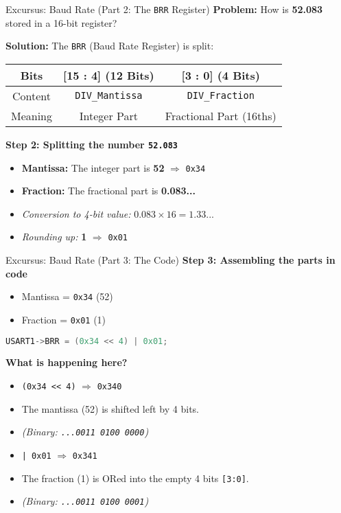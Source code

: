 \documentclass{beamer}
\begin{document}
\begin{frame}{Excursus: Baud Rate (Part 2: The \texttt{BRR} Register)}
\textbf{Problem:} How is \textbf{52.083} stored in a 16-bit register?

\medskip
\textbf{Solution:} The \texttt{BRR} (Baud Rate Register) is split:

\begin{center}
\begin{tabular}{|c|c|c|}
	\hline
	Bits & \textbf{[15 : 4]} (12 Bits) & \textbf{[3 : 0]} (4 Bits) \\ \hline
	Content & \texttt{DIV\_Mantissa} & \texttt{DIV\_Fraction} \\ 
	Meaning & Integer Part & Fractional Part (16ths) \\ \hline
\end{tabular}
\end{center}

\medskip
\textbf{Step 2: Splitting the number \texttt{52.083}}
\begin{itemize}
\item \textbf{Mantissa:} The integer part is \textbf{52} $\Rightarrow$ \texttt{0x34}
\item \textbf{Fraction:} The fractional part is \textbf{0.083...}
\item \textit{Conversion to 4-bit value:} $0.083 \times 16 = 1.33...$
\item \textit{Rounding up:} \textbf{1} $\Rightarrow$ \texttt{0x01}
\end{itemize}
\end{frame}

\begin{frame}[fragile]{Excursus: Baud Rate (Part 3: The Code)}
\textbf{Step 3: Assembling the parts in code}
\begin{itemize}
\item Mantissa = \texttt{0x34} (52)
\item Fraction = \texttt{0x01} (1)
\end{itemize}

\bigskip
\begin{lstlisting}[language=C, style=mystyle]
USART1->BRR = (0x34 << 4) | 0x01;
\end{lstlisting}

\textbf{What is happening here?}
\begin{itemize}
\item \texttt{(0x34 << 4)} $\Rightarrow$ \texttt{0x340}
\item The mantissa (52) is shifted left by 4 bits.
\item \textit{(Binary: \texttt{...0011 0100 0000})}

\medskip
\item \texttt{| 0x01} $\Rightarrow$ \texttt{0x341}
\item The fraction (1) is ORed into the empty 4 bits \texttt{[3:0]}.
\item \textit{(Binary: \texttt{...0011 0100 0001})}
\end{itemize}
\end{frame}
\end{document}
